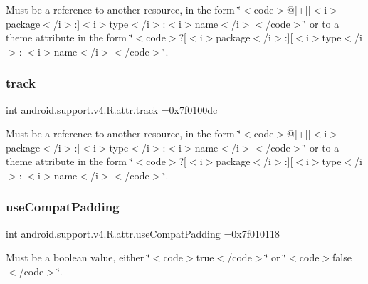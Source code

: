 Must be a reference to another resource, in the form \char`\"{}$<$code$>$@\mbox{[}+\mbox{]}\mbox{[}$<$i$>$package$<$/i$>$\+:\mbox{]}$<$i$>$type$<$/i$>$\+:$<$i$>$name$<$/i$>$$<$/code$>$\char`\"{} or to a theme attribute in the form \char`\"{}$<$code$>$?\mbox{[}$<$i$>$package$<$/i$>$\+:\mbox{]}\mbox{[}$<$i$>$type$<$/i$>$\+:\mbox{]}$<$i$>$name$<$/i$>$$<$/code$>$\char`\"{}. \mbox{\label{classandroid_1_1support_1_1v4_1_1R_1_1attr_ad9d65c0fbafbf126efc40c5c1d6a467b}} 
\subsubsection{\texorpdfstring{track}{track}}
{\footnotesize\ttfamily int android.\+support.\+v4.\+R.\+attr.\+track =0x7f0100dc\hspace{0.3cm}{\ttfamily [static]}}

Must be a reference to another resource, in the form \char`\"{}$<$code$>$@\mbox{[}+\mbox{]}\mbox{[}$<$i$>$package$<$/i$>$\+:\mbox{]}$<$i$>$type$<$/i$>$\+:$<$i$>$name$<$/i$>$$<$/code$>$\char`\"{} or to a theme attribute in the form \char`\"{}$<$code$>$?\mbox{[}$<$i$>$package$<$/i$>$\+:\mbox{]}\mbox{[}$<$i$>$type$<$/i$>$\+:\mbox{]}$<$i$>$name$<$/i$>$$<$/code$>$\char`\"{}. \mbox{\label{classandroid_1_1support_1_1v4_1_1R_1_1attr_a0a5254de741dc249871162023aef2477}} 
\subsubsection{\texorpdfstring{use\+Compat\+Padding}{useCompatPadding}}
{\footnotesize\ttfamily int android.\+support.\+v4.\+R.\+attr.\+use\+Compat\+Padding =0x7f010118\hspace{0.3cm}{\ttfamily [static]}}

Must be a boolean value, either \char`\"{}$<$code$>$true$<$/code$>$\char`\"{} or \char`\"{}$<$code$>$false$<$/code$>$\char`\"{}. 

